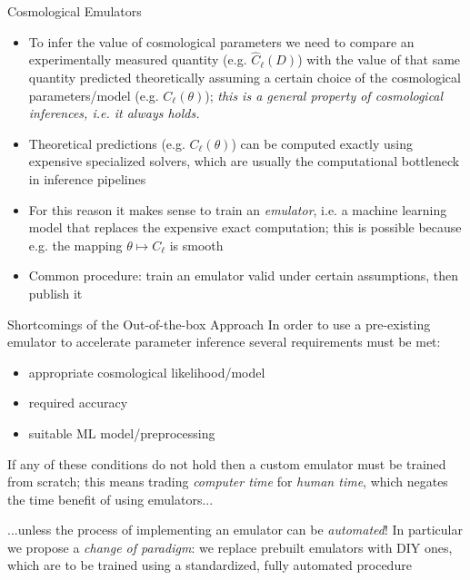 \documentclass[aspectratio=43,xcolor=svgnames]{beamer} %
\begin{document}
\begin{frame}{Cosmological Emulators}
    \begin{itemize}[<+->]
        \item To infer the value of cosmological parameters we need to compare an experimentally measured quantity (e.g. $\hat{C}_\ell(D)$) with the value of that same quantity predicted theoretically assuming a certain choice of the cosmological parameters/model (e.g. $C_\ell(\theta)$); \emph{this is a general property of cosmological inferences, i.e. it always holds.}
        \item Theoretical predictions (e.g. $C_\ell(\theta)$) can be computed exactly using expensive specialized solvers, which are usually the computational bottleneck in inference pipelines
        \item For this reason it makes sense to train an \emph{emulator}, i.e. a machine learning model that replaces the expensive exact computation; this is possible because e.g. the mapping $\theta \mapsto C_\ell$ is smooth
        \item Common procedure: train an emulator valid under certain assumptions, then publish it
    \end{itemize}
\end{frame}

\begin{frame}{Shortcomings of the Out-of-the-box Approach}
In order to use a pre-existing emulator to accelerate parameter inference several requirements must be met:
\pause
\begin{itemize}[<+->]
    \item appropriate cosmological likelihood/model
    \item required accuracy
    \item suitable ML model/preprocessing
\end{itemize}
\pause
\vspace{1.5em}
If any of these conditions do not hold then a custom emulator must be trained from scratch; this means trading \emph{computer time} for \emph{human time}, which negates the time benefit of using emulators...
\pause
\vspace{0.7em}


...unless the process of implementing an emulator can be \emph{automated}!
\pause
In particular we propose a \emph{change of paradigm}: we replace prebuilt emulators with DIY ones, which are to be trained using a standardized, fully automated procedure
\end{frame}
\end{document}
